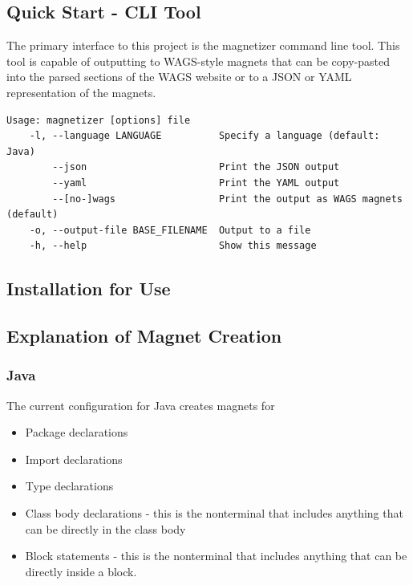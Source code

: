 \documentclass[letter,10pt]{article}
\begin{document}
\subsection{Quick Start - CLI Tool}

The primary interface to this project is the magnetizer command line 
tool. This tool is capable of outputting to WAGS-style magnets that can 
be copy-pasted into the parsed sections of the WAGS website or to a 
JSON or YAML representation of the magnets.

\begin{verbatim}
Usage: magnetizer [options] file
    -l, --language LANGUAGE          Specify a language (default: Java)
        --json                       Print the JSON output
        --yaml                       Print the YAML output
        --[no-]wags                  Print the output as WAGS magnets 
(default)
    -o, --output-file BASE_FILENAME  Output to a file
    -h, --help                       Show this message
\end{verbatim}



\subsection{Installation for Use}

\subsection{Explanation of Magnet Creation}


\subsubsection{Java}
The current configuration for Java creates magnets for
\begin{itemize}
 \item Package declarations
 \item Import declarations
 \item Type declarations
 \item Class body declarations - this is the nonterminal that includes 
anything that can be directly in the class body
 \item Block statements - this is the nonterminal that includes 
anything that can be directly inside a block.
\end{itemize}
\end{document}
